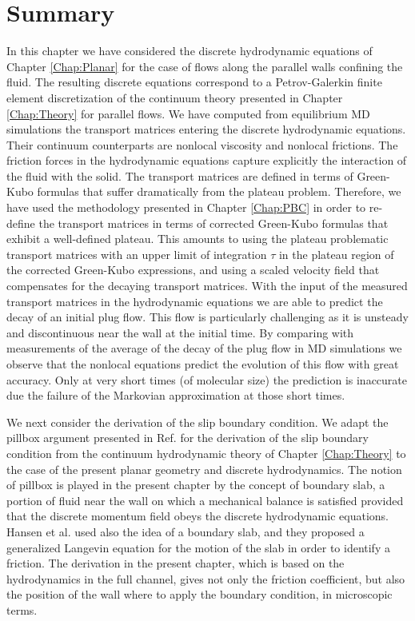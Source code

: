 \documentclass[b5paper,openright,10pt]{book}
\begin{document}
\section{Summary}

In this chapter  we have  considered the  discrete hydrodynamic
equations of  Chapter \ref{Chap:Planar} for  the case of  flows along the  parallel walls
confining the fluid. The resulting  discrete equations correspond to a
Petrov-Galerkin finite element discretization  of the continuum theory
presented in Chapter \ref{Chap:Theory} for  parallel flows.  We have computed
from equilibrium  MD simulations  the transport matrices  entering the
discrete  hydrodynamic equations.   Their  continuum counterparts  are
nonlocal viscosity  and nonlocal frictions.  The  friction forces in
the hydrodynamic  equations capture explicitly the  interaction of the
fluid with the solid.  The transport  matrices are defined in terms of
Green-Kubo formulas that suffer dramatically from the plateau problem.
Therefore, we have used the methodology presented in Chapter \ref{Chap:PBC} in
order  to  re-define the  transport  matrices  in terms  of  corrected
Green-Kubo  formulas  that  exhibit   a  well-defined  plateau.   This
amounts to using  the plateau problematic transport  matrices with an
upper  limit  of integration  $\tau$  in  the  plateau region  of  the
corrected Green-Kubo  expressions, and  using a scaled  velocity field
that compensates for the decaying  transport matrices.  With the input
of the  measured transport matrices  in the hydrodynamic  equations we
are able to predict  the decay of an initial plug  flow.  This flow is
particularly challenging as  it is unsteady and discontinuous near the  wall at the
initial time.   By comparing with  measurements of the average  of the
decay of the plug flow in MD simulations we observe that the nonlocal
equations predict the evolution of this flow with great accuracy. Only
at very short  times (of molecular size) the  prediction is inaccurate
due the failure of the Markovian approximation at those short times.

We next  consider the  derivation of the  slip boundary  condition. We
adapt  the  pillbox  argument  presented in  Ref.   \cite{CamargoBC2018}  for  the
derivation  of   the  slip  boundary  condition   from  the  continuum
hydrodynamic theory of Chapter \ref{Chap:Theory} to the case  of the present
planar geometry and  discrete hydrodynamics. The notion  of pillbox is
played in the present chapter by  the concept of boundary slab, a portion
of fluid  near the  wall on  which a  mechanical balance  is satisfied
provided  that   the  discrete  momentum  field   obeys  the  discrete
hydrodynamic equations. Hansen et  al. \cite{Hansen2011} used also the
idea  of a  boundary slab,  and they  proposed a  generalized Langevin
equation  for  the  motion  of  the   slab  in  order  to  identify  a
friction. The derivation  in the present chapter, which is  based on the
hydrodynamics  in  the  full  channel, gives  not  only  the  friction
coefficient, but also the position of the wall where to apply the boundary condition, in microscopic terms.
\end{document}
